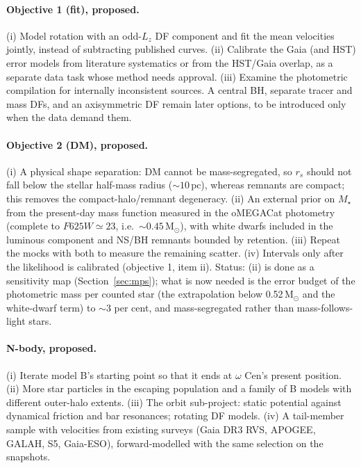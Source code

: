 \documentclass[11pt,a4paper]{article}
\newcommand{\Msun}{\ensuremath{\mathrm{M}_\odot}\xspace}
\newcommand{\pc}{\ensuremath{\,\mathrm{pc}}\xspace}
\begin{document}
\paragraph{Objective 1 (fit), proposed.}
(i) Model rotation with an odd-$L_z$ DF component and fit the mean
velocities jointly, instead of subtracting published curves.
(ii) Calibrate the Gaia (and HST) error models from literature systematics
or from the HST/Gaia overlap, as a separate data task whose method needs
approval.
(iii) Examine the photometric compilation for internally inconsistent
sources.
A central BH, separate tracer and mass DFs, and an axisymmetric DF remain
later options, to be introduced only when the data demand them.

\paragraph{Objective 2 (DM), proposed.}
(i) A physical shape separation: DM cannot be mass-segregated, so
$r_s$ should not fall below the stellar half-mass radius ($\sim10\pc$),
whereas remnants are compact; this removes the compact-halo/remnant
degeneracy. (ii) An external prior on $M_\star$ from the present-day mass
function measured in the oMEGACat photometry (complete to $F625W\simeq23$,
i.e.\ $\sim0.45\,\Msun$), with white dwarfs included in the luminous
component and NS/BH remnants bounded by retention. (iii) Repeat the mocks
with both to measure the remaining scatter. (iv) Intervals only after the
likelihood is calibrated (objective 1, item ii).
Status: (ii) is done as a sensitivity map (Section~\ref{sec:mps}); what is
now needed is the error budget of the photometric mass per counted star
(the extrapolation below 0.52\,\Msun and the white-dwarf term) to
$\sim3$ per cent, and mass-segregated rather than mass-follows-light stars.

\paragraph{N-body, proposed.}
(i) Iterate model B's starting point so that it ends at $\omega$ Cen's
present position. (ii) More star particles in the escaping population and a
family of B models with different outer-halo extents. (iii) The orbit
sub-project: static potential against dynamical friction and bar
resonances; rotating DF models. (iv) A tail-member sample with velocities
from existing surveys (Gaia DR3 RVS, APOGEE, GALAH, S5, Gaia-ESO),
forward-modelled with the same selection on the snapshots.
\end{document}
